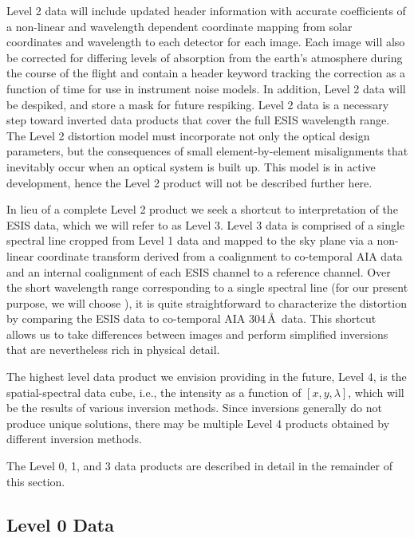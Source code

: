 Level 2 data will include updated header information with accurate coefficients of a non-linear and wavelength dependent coordinate mapping from solar coordinates and wavelength to each detector for each image. 
Each image will also be corrected for differing levels of absorption from the earth's atmosphere during the course of the flight and contain a header keyword tracking the correction as a function of time for use in instrument noise models.
In addition, Level 2 data will be despiked, and store a mask for future respiking.
Level 2 data is a necessary step toward inverted data products that cover the full ESIS wavelength range. The Level 2 distortion model must incorporate not only the optical design parameters, but the consequences of small element-by-element misalignments that inevitably occur when an optical system is built up.  This model is in active development, hence the Level 2 product will not be described further here.


In lieu of a complete Level 2 product we seek a shortcut to interpretation of the ESIS data, which  we will refer to as Level 3.
Level 3 data is comprised of a single spectral line cropped from Level 1 data and mapped to the sky plane via a non-linear coordinate transform derived from a coalignment to co-temporal AIA data and an internal coalignment of each ESIS channel to a reference channel. Over the short wavelength range corresponding to a single spectral line (for our present purpose, we will choose \ov), it is quite straightforward to characterize the distortion by comparing the ESIS data to co-temporal AIA 304\,\AA\ data. This shortcut allows us to take differences between images and perform simplified inversions that are nevertheless rich in physical detail.

The highest level data product we envision providing in the future, Level 4, is the spatial-spectral data cube, i.e., the intensity as a function of $[x, y , \lambda]$, which will be the results of various inversion methods.    
Since inversions generally do not produce unique solutions, there may be multiple Level 4 products obtained by different inversion methods.
   

The Level 0, 1, and 3 data products are described in detail in the remainder of this section. 


    
\subsection{Level 0 Data}
    
